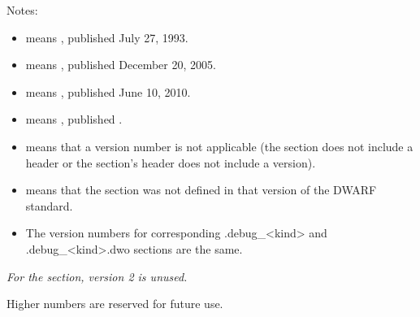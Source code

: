 Notes:

\begin{itemize}
\item  {} means , published July 27, 1993.
\item  {} means , published December 20, 2005.
\item  {} means , published June 10, 2010.
\item  {} means , published 
			.
\item  \doublequote{-} means that a version number is not applicable
(the section does not include a header or the section's header does not include a version).

\item  {} means that the section was not defined in that
version of the DWARF standard.

\item  The version numbers for corresponding .debug\_<kind> and .debug\_<kind>.dwo 
sections are the same.

\end{itemize}

\textit{For the \dotdebugframe{} section, version 2 is unused.}

Higher numbers are reserved for future use.

